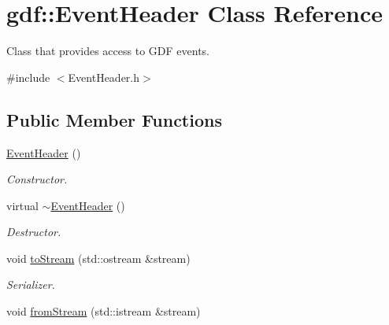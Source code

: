 \hypertarget{classgdf_1_1_event_header}{
\section{gdf::EventHeader Class Reference}
\label{classgdf_1_1_event_header}
}


Class that provides access to GDF events.  




{\ttfamily \#include $<$EventHeader.h$>$}

\subsection*{Public Member Functions}
\begin{DoxyCompactItemize}
\item 
\hypertarget{classgdf_1_1_event_header_a2182bca6b8218be97f069e74c27ad81c}{
\hyperlink{classgdf_1_1_event_header_a2182bca6b8218be97f069e74c27ad81c}{EventHeader} ()}
\label{classgdf_1_1_event_header_a2182bca6b8218be97f069e74c27ad81c}

\begin{DoxyCompactList}\small\item\em Constructor. \item\end{DoxyCompactList}\item 
\hypertarget{classgdf_1_1_event_header_a20252e9799545069a2ec27f78b137c11}{
virtual \hyperlink{classgdf_1_1_event_header_a20252e9799545069a2ec27f78b137c11}{$\sim$EventHeader} ()}
\label{classgdf_1_1_event_header_a20252e9799545069a2ec27f78b137c11}

\begin{DoxyCompactList}\small\item\em Destructor. \item\end{DoxyCompactList}\item 
\hypertarget{classgdf_1_1_event_header_ac77886ed06b41e7a2ac6ba8811c68de1}{
void \hyperlink{classgdf_1_1_event_header_ac77886ed06b41e7a2ac6ba8811c68de1}{toStream} (std::ostream \&stream)}
\label{classgdf_1_1_event_header_ac77886ed06b41e7a2ac6ba8811c68de1}

\begin{DoxyCompactList}\small\item\em Serializer. \item\end{DoxyCompactList}\item 
\hypertarget{classgdf_1_1_event_header_a0f6967002bb5766d55a683beae63ebd5}{
void \hyperlink{classgdf_1_1_event_header_a0f6967002bb5766d55a683beae63ebd5}{fromStream} (std::istream \&stream)}
\label{classgdf_1_1_event_header_a0f6967002bb5766d55a683beae63ebd5}


\end{DoxyCompactItemize}
